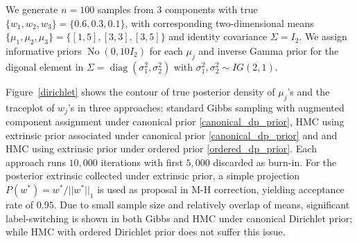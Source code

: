 \documentclass[10pt]{article}
\DeclareMathOperator{\No}{No}
\DeclareMathOperator{\diag}{diag}
\DeclareMathOperator{\1}{\mathbbm{1}}
\begin{document}
We generate $n=100$ samples from $3$ components with true $\{w_1,w_2,w_3\}=\{0.6,0.3,0.1\}$, with corresponding two-dimensional means $\{\mu_1,\mu_2,\mu_3\} = \{[1,5], [3,3], [3,5]\}$ and identity covariance $\Sigma = I_2$. We assign informative priors $\No(0,10 I_2)$ for each $\mu_j$ and inverse Gamma prior for the digonal element in $\Sigma=\diag(\sigma_1^2,\sigma_2^2)$ with $\sigma^2_1, \sigma^2_2\sim IG(2,1)$.  

Figure~\ref{dirichlet} shows the contour of true posterior density of $\mu_j$'s and the traceplot of $w_j$'s in three approaches: standard Gibbs sampling with augmented component assignment \citep{diebolt1994estimation} under canonical prior \eqref{canonical_dp_prior}, HMC using extrinsic prior associated under canonical  prior \eqref{canonical_dp_prior} and and HMC using extrinsic prior under ordered prior \eqref{ordered_dp_prior}. Each approach runs $10,000$ iterations with first $5,000$ discarded as burn-in. For the posterior extrinsic collected under extrinsic prior, a simple projection $P(w^*)=w^*/||w^*||_1$ is used as proposal in M-H correction, yielding acceptance rate of $0.95$. Due to small sample size and relatively overlap of means, significant label-switching is shown in both Gibbs and HMC under canonical Dirichlet prior; while HMC with ordered Dirichlet prior does not suffer this issue.
\end{document}
